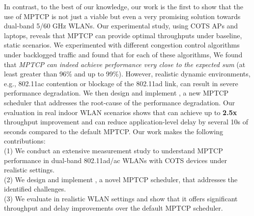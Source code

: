 In contrast, to the best of our knowledge, our work is the first to 
show that the use of MPTCP is not just a viable but even a very promising solution
towards dual-band 5/60 GHz WLANs. 
Our experimental study, using COTS APs and laptops, reveals that 
MPTCP can provide optimal throughputs under baseline, static scenarios.
We experimented with 
different congestion control algorithms 
under backlogged
traffic and found that for each of 
these
algorithms, 
\fi
We found that
\textit{MPTCP
can indeed achieve performance very close to the expected sum} (at
least greater than 96\% and up to 99\%).
However, realistic dynamic environments, e.g., 802.11ac contention or 
blockage of the 802.11ad link, 
can result in severe performance degradation. We then design and implement \name, a new
MPTCP scheduler that addresses the root-cause of the performance
degradation.
\fi
Our evaluation in real
indoor WLAN scenarios shows that \name can achieve up to \textbf{2.5x}
throughput improvement and can reduce application-level delay by several
10s of seconds compared to the default MPTCP.
\fi
Our work makes the following contributions:
\\
(1) We conduct an extensive measurement study to understand MPTCP
performance in dual-band 802.11ad/ac WLANs with COTS devices under
realistic settings.
\\
(2) We design and implement \name, a novel MPTCP scheduler, that
addresses the identified challenges.
\\
(3) We evaluate \name in realistic WLAN settings and show that it
offers significant throughput and delay improvements over the default
MPTCP scheduler.
\fi
